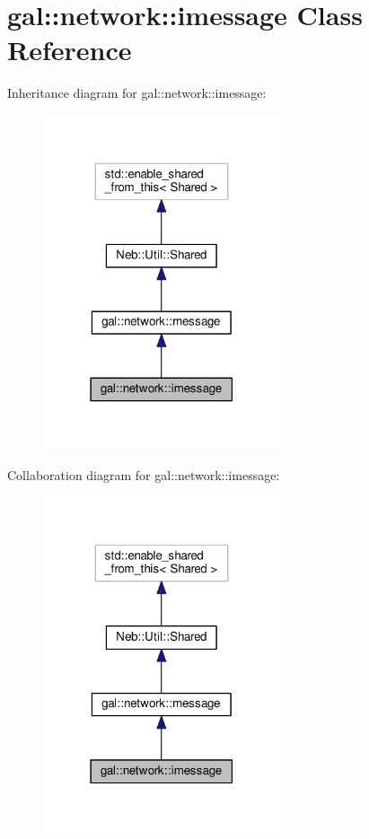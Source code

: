\hypertarget{classgal_1_1network_1_1imessage}{\section{gal\-:\-:network\-:\-:imessage Class Reference}
\label{classgal_1_1network_1_1imessage}
}


Inheritance diagram for gal\-:\-:network\-:\-:imessage\-:
\nopagebreak
\begin{figure}[H]
\begin{center}
\leavevmode
\includegraphics[width=198pt]{classgal_1_1network_1_1imessage__inherit__graph}
\end{center}
\end{figure}


Collaboration diagram for gal\-:\-:network\-:\-:imessage\-:
\nopagebreak
\begin{figure}[H]
\begin{center}
\leavevmode
\includegraphics[width=198pt]{classgal_1_1network_1_1imessage__coll__graph}
\end{center}
\end{figure}
